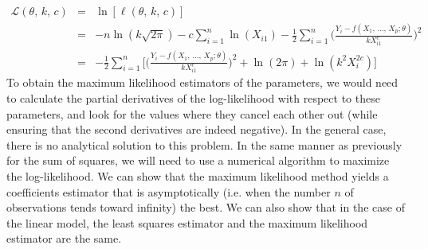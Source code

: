 \begin{eqnarray}
\mathcal{L}(\theta,\,k,\,c) &=&
\ln[\ell(\theta,\,k,\,c)]\label{ll}
\\ &=& -n\ln(k\sqrt{2\pi})-c\sum_{i=1}^n\ln(X_{i1})-\frac{1}{2}\sum_{i=1}^n\bigg(
\frac{Y_i-f(X_1,\,\ldots,\,X_p;\theta)}{kX_{i1}^c}\bigg)^2\nonumber
\\ &=& -\frac{1}{2}\sum_{i=1}^n\bigg[\bigg(
\frac{Y_i-f(X_1,\,\ldots,\,X_p;\theta)}{kX_{i1}^c}\bigg)^2
+\ln(2\pi)+\ln(k^2X_i^{2c})\bigg]\nonumber
\end{eqnarray}
To obtain the maximum likelihood estimators of the parameters, we would need to calculate the partial derivatives of the log-likelihood with respect to these parameters, and look for the values where they cancel each other out (while ensuring that the second derivatives are indeed negative). In the general case, there is no analytical solution to this problem. In the same manner as previously for the sum of squares, we will need to use a numerical algorithm to maximize the log-likelihood.
We can show that the maximum likelihood method yields a coefficients estimator that is asymptotically (i.e. when the number $n$ of observations tends toward infinity) the best. We can also show that in the case of the linear model, the least squares estimator and the maximum likelihood estimator are the same.

